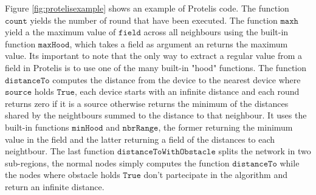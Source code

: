 Figure \ref{fig:protelisexample} shows an example of Protelis code. The function $\mathtt{count}$ yields the number of round that have been executed. The function $\mathtt{maxh}$ yield a the maximum value of $\mathtt{field}$ across all neighbours using the built-in function $\mathtt{maxHood}$, which takes a field as argument an returns the maximum value. Its important to note that the only way to extract a regular value from a field in Protelis is to use one of the many built-in "hood" functions. The function $\mathtt{distanceTo}$ computes the distance from the device to the nearest device where $\mathtt{source}$ holds $\mathtt{True}$, each device starts with an infinite distance and each round returns zero if it is a source otherwise returns the minimum of the distances shared by the neightbours summed to the distance to that neighbour. It uses the built-in functions $\mathtt{minHood}$ and $\mathtt{nbrRange}$, the former returning the minimum value in the field and the latter returning a field of the distances to each neightbour. The last function $\mathtt{distanceToWithObstacle}$ splits the network in two sub-regions, the normal nodes simply computes the function $\mathtt{distanceTo}$ while the nodes where obstacle holds $\mathtt{True}$ don't partecipate in the algorithm and return an infinite distance.